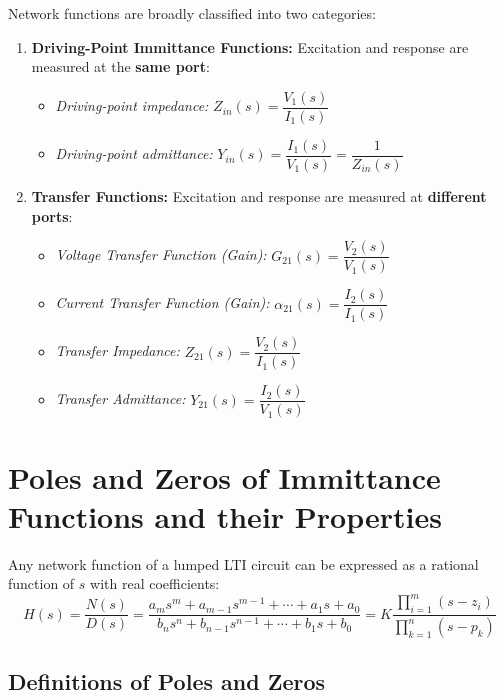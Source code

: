 \documentclass[12pt,a4paper]{article}
\begin{document}
Network functions are broadly classified into two categories:
\begin{enumerate}[leftmargin=*]
  \item \textbf{Driving-Point Immittance Functions:} Excitation and response are measured at the \textbf{same port}:
  \begin{itemize}
    \item \textit{Driving-point impedance:} $Z_{in}(s) = \dfrac{V_1(s)}{I_1(s)}$
    \item \textit{Driving-point admittance:} $Y_{in}(s) = \dfrac{I_1(s)}{V_1(s)} = \dfrac{1}{Z_{in}(s)}$
  \end{itemize}
  \item \textbf{Transfer Functions:} Excitation and response are measured at \textbf{different ports}:
  \begin{itemize}
    \item \textit{Voltage Transfer Function (Gain):} $G_{21}(s) = \dfrac{V_2(s)}{V_1(s)}$
    \item \textit{Current Transfer Function (Gain):} $\alpha_{21}(s) = \dfrac{I_2(s)}{I_1(s)}$
    \item \textit{Transfer Impedance:} $Z_{21}(s) = \dfrac{V_2(s)}{I_1(s)}$
    \item \textit{Transfer Admittance:} $Y_{21}(s) = \dfrac{I_2(s)}{V_1(s)}$
  \end{itemize}
\end{enumerate}

\section{Poles and Zeros of Immittance Functions and their Properties}

Any network function of a lumped LTI circuit can be expressed as a rational function of $s$ with real coefficients:
\begin{equation}
  H(s) = \frac{N(s)}{D(s)} = \frac{a_m s^m + a_{m-1} s^{m-1} + \cdots + a_1 s + a_0}{b_n s^n + b_{n-1} s^{n-1} + \cdots + b_1 s + b_0} = K \frac{\prod_{i=1}^m (s - z_i)}{\prod_{k=1}^n (s - p_k)}
\end{equation}

\subsection{Definitions of Poles and Zeros}
\end{document}
